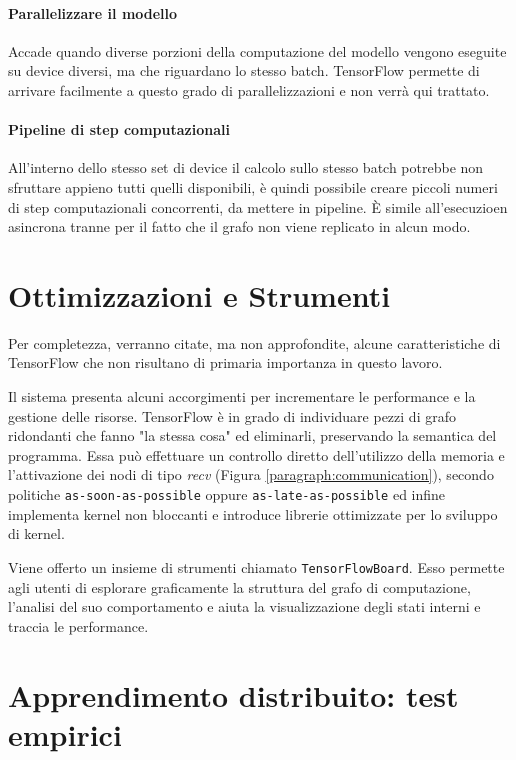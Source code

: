 \documentclass[DIV=calc, paper=a4, fontsize=11pt]{scrartcl}	 %
\begin{document}
\begin{multicols}{2}
			\paragraph{Parallelizzare il modello} Accade quando diverse porzioni della computazione del modello vengono eseguite su device diversi, ma che riguardano lo stesso batch. TensorFlow permette di arrivare facilmente a questo grado di parallelizzazioni e non verrà qui trattato.
			\paragraph{Pipeline di step computazionali} All'interno dello stesso set di device il calcolo sullo stesso batch potrebbe non sfruttare appieno tutti quelli disponibili, è quindi possibile creare piccoli numeri di step computazionali concorrenti, da mettere in pipeline. È simile all'esecuzioen asincrona tranne per il fatto che il grafo non viene replicato in alcun modo.			
		
		\section{Ottimizzazioni e Strumenti}
		Per completezza, verranno citate, ma non approfondite, alcune caratteristiche di TensorFlow che non risultano di primaria importanza in questo lavoro.
		
		Il sistema presenta alcuni accorgimenti per incrementare le performance e la gestione delle risorse. TensorFlow è in grado di individuare pezzi di grafo ridondanti che fanno "la stessa cosa" ed eliminarli, preservando la semantica del programma. Essa può effettuare un controllo diretto dell'utilizzo della memoria e l'attivazione dei nodi di tipo \textit{recv} (Figura \ref{paragraph:communication}), secondo politiche \texttt{as-soon-as-possible} oppure \texttt{as-late-as-possible} ed infine implementa kernel non bloccanti e introduce librerie ottimizzate per lo sviluppo di kernel.
		
		Viene offerto un insieme di strumenti chiamato \texttt{TensorFlowBoard}. Esso permette agli utenti di esplorare graficamente la struttura del grafo di computazione, l'analisi del suo comportamento e aiuta la visualizzazione degli stati interni e traccia le performance.
		
		\section{Apprendimento distribuito: test empirici}
		

\end{multicols}
\end{document}
